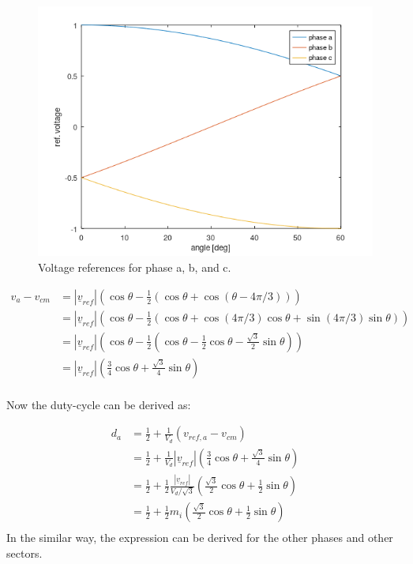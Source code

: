 \documentclass[]{book}
\begin{document}
\begin{figure}
\includegraphics[width=0.75\linewidth]{images/modulation/phase-ref-voltages-abc} \caption{Voltage references for phase a, b, and c.}\label{fig:unnamed-chunk-6}
\end{figure}

\[
\begin{aligned}
v_a-v_{cm}  & = |\underline{v}_{ref}| \left( \cos{\theta} - \frac{1}{2}(\cos{\theta}  + \cos{(\theta - 4\pi/3)})  \right)\\
& = |\underline{v}_{ref}| \left( \cos{\theta} - \frac{1}{2}(\cos{\theta}  + \cos{(4\pi/3)}\cos{\theta}+\sin{( 4\pi/3)}\sin{\theta})  \right)\\
& = |\underline{v}_{ref}| \left( \cos{\theta} - \frac{1}{2}(\cos{\theta}  - \frac{1}{2}\cos{\theta} - \frac{\sqrt{3}}{2}\sin{\theta})  \right)\\
& = |\underline{v}_{ref}| ( \frac{3}{4} \cos{\theta}  + \frac{\sqrt{3}}{4}\sin{\theta}  )\\
\end{aligned}
\]

Now the duty-cycle can be derived as:

\[
\begin{aligned}
d_a  & = \frac{1}{2} +\frac{1}{V_d}  (v_{ref,a} - v_{cm}) \\
  & = \frac{1}{2} +\frac{1}{V_d}  |\underline{v}_{ref}| ( \frac{3}{4} \cos{\theta}  + \frac{\sqrt{3}}{4}\sin{\theta}  ) \\
  & = \frac{1}{2} + \frac{1}{2} \frac{|\underline{v}_{ref}|}{V_d/\sqrt{3}} ( \frac{\sqrt{3}}{2} \cos{\theta}  + \frac{1}{2}\sin{\theta}  ) \\
& = \frac{1}{2} +  \frac{1}{2} m_i  ( \frac{\sqrt{3}}{2} \cos{\theta}  + \frac{1}{2}\sin{\theta}  ) \\
\end{aligned}
\]
In the similar way, the expression can be derived for the other phases and other sectors.


\end{document}
